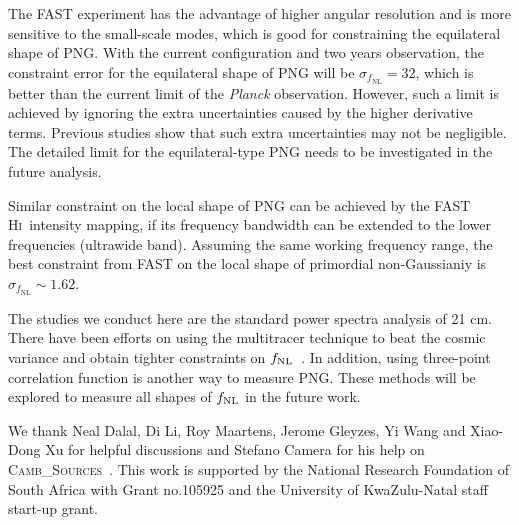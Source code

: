 \documentclass[twocolumn,floatfix,nofootinbib,aps,reprint]{revtex4}
\def\hi{\textsc{Hi~}}
\def\cambs{\textsc{Camb\_Sources~}}
\begin{document}
The FAST experiment has the advantage of higher angular resolution
and is more sensitive to the small-scale modes, which is good for 
constraining the equilateral shape of PNG.
With the current configuration and two years observation, the 
constraint error for the equilateral shape of PNG 
will be $\sigma_{f_\mathrm{NL}}=32$, which is better than the current limit of the
{\it Planck} observation. However, such a limit is achieved by ignoring 
the extra uncertainties caused by the higher derivative terms. 
Previous studies show that such extra uncertainties may not be negligible.
The detailed limit for the equilateral-type PNG needs to be investigated in
the future analysis.

Similar constraint on the local shape of PNG 
can be achieved by the FAST \hi intensity mapping, if its frequency
bandwidth can be extended to the lower frequencies (ultrawide band). Assuming the
same working frequency range, the best constraint from FAST on 
the local shape of primordial non-Gaussianiy is $\sigma_{f_\mathrm{NL}}\sim1.62$.

The studies we conduct here are the standard power spectra analysis of 21 cm. There have been efforts on 
using the multitracer technique to beat the cosmic variance and obtain tighter constraints on $f_{\rm NL}$~\cite{Abramo13,Fonseca15,Alonso15}. In addition, using three-point correlation function is another way to measure PNG. These methods will be explored to measure all shapes of $f_{\rm NL}$ in the future work.

\acknowledgements
We thank Neal Dalal, Di Li, 
Roy Maartens, Jerome Gleyzes, Yi Wang and Xiao-Dong Xu for helpful discussions and 
Stefano Camera for his help on \cambs. This work is 
supported by the National Research Foundation of South Africa with 
Grant no.105925 and the University of KwaZulu-Natal staff start-up grant.


%
%
%


\end{document}

